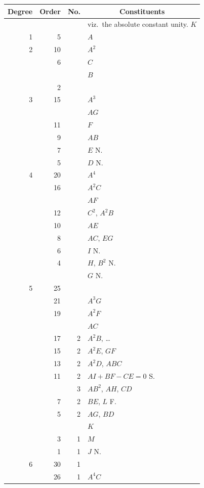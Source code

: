 \documentclass[11pt,a4paper]{article}
\theoremstyle{cayley}
\begin{document}
\begin{center}
\begin{tabular}{rrrl}
\toprule
Degree & Order & No. & \multicolumn{1}{c}{Constituents} \\
\midrule
 & & & viz.\ the absolute constant unity. $K$ \\
1 & 5 & & $A$ \\
2 & 10 & & $A^2$ \\
  &  6 & & $C$ \\
  &    & & $B$ \\
  &  2 & & \\
3 & 15 & & $A^3$ \\
  &    & & $AG$ \\
  & 11 & & $F$ \\
  &  9 & & $AB$ \\
  &  7 & & $E$ \quad N. \\
  &  5 & & $D$ \quad N. \\
4 & 20 & & $A^4$ \\
  & 16 & & $A^2C$ \\
  &    & & $AF$ \\
  & 12 & & $C^2$, $A^2B$ \\
  & 10 & & $AE$ \\
  &  8 & & $AC$, $EG$ \\
  &  6 & & $I$ \quad N. \\
  &  4 & & $H$, $B^2$ \quad N. \\
  &    & & $G$ \quad N. \\
5 & 25 & & \\
  & 21 & & $A^3G$ \\
  & 19 & & $A^2F$ \\
  &    & & $AC$ \\
  & 17 & 2 & $A^2B$, \quad\dots \\
  & 15 & 2 & $A^2E$, $GF$ \\
  & 13 & 2 & $A^2D$, $ABC$ \\
  & 11 & 2 & $AI + BF - CE = 0$ \quad S. \\
  &    & 3 & $AB^2$, $AH$, $CD$ \\
  &  7 & 2 & $BE$, $L$ \quad F. \\
  &  5 & 2 & $AG$, $BD$ \\
  &    & & $K$ \\
  &  3 & 1 & $M$ \\
  &  1 & 1 & $J$ \quad N. \\
6 & 30 & 1 & \\
  & 26 & 1 & $A^4C$ \\

\end{tabular}
\end{center}
\end{document}
